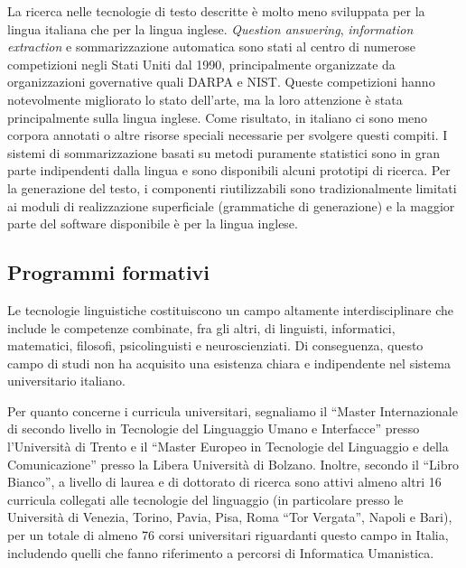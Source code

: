 \documentclass[]{../../metanetpaper}
\begin{document}
\begin{multicols}{2}

La ricerca nelle tecnologie di testo descritte \`{e} molto meno sviluppata per la lingua italiana che per la lingua inglese. \emph{Question answering}, \emph{information extraction} e sommarizzazione automatica sono stati al centro di numerose competizioni negli Stati Uniti dal 1990, principalmente organizzate da organizzazioni governative quali DARPA e NIST. Queste competizioni hanno notevolmente migliorato lo stato dell'arte, ma la loro attenzione \`{e} stata principalmente sulla lingua inglese. Come risultato, in italiano ci sono meno corpora annotati o altre risorse speciali necessarie per svolgere questi compiti. I sistemi di sommarizzazione basati su  metodi puramente statistici sono in gran parte indipendenti dalla lingua e sono disponibili alcuni prototipi di ricerca. Per la generazione del testo, i componenti riutilizzabili sono tradizionalmente limitati ai moduli di realizzazione superficiale (grammatiche di generazione) e la maggior parte del software disponibile \`{e} per la lingua inglese.


\subsection{Programmi formativi}

Le tecnologie linguistiche costituiscono un campo altamente interdisciplinare che include le competenze combinate, fra gli altri, di linguisti, informatici, matematici, filosofi, psicolinguisti e neuroscienziati. Di conseguenza, questo campo di studi non ha acquisito una esistenza chiara e indipendente nel sistema universitario italiano.

Per quanto concerne i curricula universitari, segnaliamo il “Master Internazionale di secondo livello in Tecnologie del Linguaggio Umano e Interfacce” presso l'Universit\`{a} di Trento e il “Master Europeo in Tecnologie del Linguaggio e della Comunicazione” presso la Libera Universit\`{a} di Bolzano. Inoltre, secondo il “Libro Bianco”, a livello di laurea e di dottorato di ricerca sono attivi almeno altri 16 curricula collegati alle tecnologie del linguaggio (in particolare presso le Universit\`{a} di Venezia, Torino, Pavia, Pisa, Roma “Tor Vergata”, Napoli e Bari), per un totale di almeno 76 corsi universitari riguardanti questo campo in Italia, includendo quelli che fanno riferimento a percorsi di Informatica Umanistica.





\end{multicols}
\end{document}
